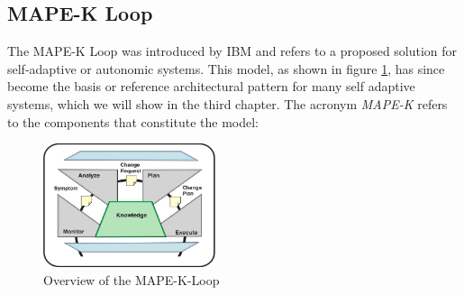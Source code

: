     \subsection{MAPE-K Loop}
    \label{sub:mape}
    The MAPE-K Loop was introduced by IBM \cite{Kephart:2003:VAC:642194.642200} and refers to a proposed solution for self-adaptive or autonomic systems.
    This model, as shown in figure \ref{fig:mape}, has since become the basis or reference architectural pattern for many self adaptive systems, which we will show in the third chapter.
    The acronym \textit{MAPE-K} refers to the components that constitute the model:
    \begin{figure}[hbt]
        \centering
        \includegraphics[width=0.45\textwidth]{Bilder/mape.png}
        \caption{
                Overview of the MAPE-K-Loop\cite{Kephart:2003:VAC:642194.642200}
        }
        \label{fig:mape}
    \end{figure}  

